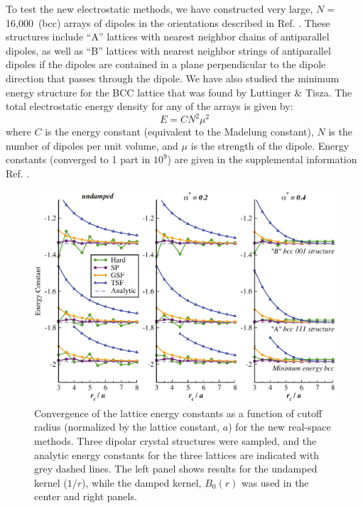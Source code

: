 To test the new electrostatic methods, we have constructed very large,
$N=$ 16,000~(bcc) arrays of dipoles in the orientations described in
Ref. \cite{LT}.  These structures include ``A'' lattices with
nearest neighbor chains of antiparallel dipoles, as well as ``B''
lattices with nearest neighbor strings of antiparallel dipoles if the
dipoles are contained in a plane perpendicular to the dipole direction
that passes through the dipole.  We have also studied the minimum
energy structure for the BCC lattice that was found by Luttinger \&
Tisza.  The total electrostatic energy density for any of the arrays
is given by:
\begin{equation}
  E = C N^2 \mu^2
\end{equation}
where $C$ is the energy constant (equivalent to the Madelung
constant), $N$ is the number of dipoles per unit volume, and $\mu$ is
the strength of the dipole. Energy constants (converged to 1 part in
$10^9$) are given in the supplemental information Ref. \cite{PaperI}.
\begin{figure}[tpb]
  \begin{center}
    \centerline{\includegraphics[width = \linewidth]{Dipoles_rcut_threeAlpha.pdf}}
    \caption{Convergence of the lattice energy constants as a function of
  cutoff radius (normalized by the lattice constant, $a$) for the new
  real-space methods.  Three dipolar crystal structures were sampled,
  and the analytic energy constants for the three lattices are
  indicated with grey dashed lines.  The left panel shows results for
  the undamped kernel ($1/r$), while the damped kernel, $B_0(r)$ was
  used in the center and right panels.}
\label{fig:Dipoles_rCut}
  \end{center}
\end{figure}

